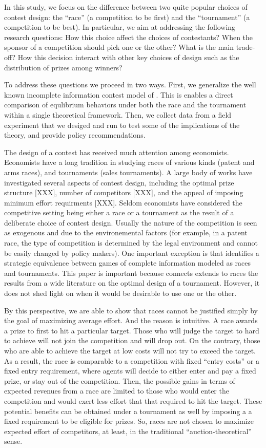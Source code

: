 \documentclass[12pt,]{article}
\begin{document}
In this study, we focus on the difference between two quite popular
choices of contest design: the ``race'' (a competition to be first) and
the ``tournament'' (a competition to be best). In particular, we aim at
addressing the following research questions: How this choice affect the
choices of contestants? When the sponsor of a competition should pick
one or the other? What is the main trade-off? How this decision interact
with other key choices of design such as the distribution of prizes
among winners?

To address these questions we proceed in two ways. First, we generalize
the well known incomplete information contest model of
\citet{moldovanu2001optimal}. This is enables a direct comparison of
equlibrium behaviors under both the race and the tournament within a
single theoretical framework. Then, we collect data from a field
experiment that we desiged and run to test some of the implications of
the theory, and provide policy recommendations.

The design of a contest has received much attention among economists.
Economists have a long tradition in studying races of various kinds
(patent and arms races), and tournaments (sales tournaments). A large
body of works have investigated several aspects of contest design,
including the optimal prize structure {[}XXX{]}, number of competitors
{[}XXX{]}, and the appeal of imposing minimum effort requirments
{[}XXX{]}. Seldom economists have considered the competitive setting
being either a race or a tournament as the result of a deliberate choice
of contest design. Usually the nature of the competition is seen as
exogenous and due to the environemental factors (for example, in a
patent race, the type of competition is determined by the legal
environment and cannot be easily changed by policy makers). One
important exception is \citet{baye2003strategic} that identifies a
strategic equivalence between games of complete information modeled as
races and tournaments. This paper is important because connects extends
to races the results from a wide literature on the optimal design of a
tournament. However, it does not shed light on when it would be
desirable to use one or the other.

By this perspective, we are able to show that races cannot be justified
simply by the goal of maximizing average effort. And the reason is
intuitive. A race awards a prize to first to hit a particular target.
Those who will judge the target to hard to achieve will not join the
competition and will drop out. On the contrary, those who are able to
achieve the target at low costs will not try to exceed the target. As a
result, the race is comparable to a competition with fixed ``entry
costs'' or a fixed entry requirement, where agents will decide to either
enter and pay a fixed prize, or stay out of the competition. Then, the
possible gains in terms of expected revenues from a race are limited to
those who would enter the competition and would exert less effort that
that required to hit the target. These potential benefits can be
obtained under a tournament as well by imposing a a fixed requirement to
be eligible for prizes. So, races are not chosen to maximize expected
effort of competitors, at least, in the traditional
``auction-theoretical'' sense.
\end{document}

